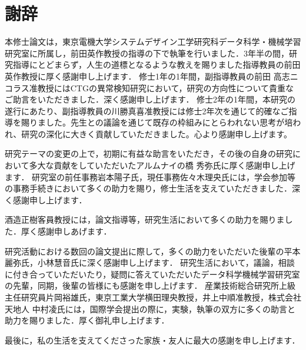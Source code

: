 \chapter*{謝辞}
本修士論文は，東京電機大学システムデザイン工学研究科データ科学・機械学習研究室に所属し，前田英作教授の指導の下で執筆を行いました．3年半の間，研究指導にとどまらず，人生の道標となるような教えを賜りました指導教員の前田英作教授に厚く感謝申し上げます．
修士1年の1年間，副指導教員の前田 高志ニコラス准教授にはCTGの異常検知研究において，研究の方向性について貴重なご助言をいただきました．深く感謝申し上げます．
修士2年の1年間，本研究の遂行にあたり、副指導教員の川勝真喜准教授には修士2年次を通じて的確なご指導を賜りました。先生との議論を通じて既存の枠組みにとらわれない思考が培われ、研究の深化に大きく貢献していただきました。心より感謝申し上げます。

研究テーマの変更の上で，初期に有益な助言をいただき，その後の自身の研究において多大な貢献をしていただいたアルムナイの橋 秀弥氏に厚く感謝申し上げます．
研究室の前任事務岩本陽子氏，現任事務佐々木理央氏には，学会参加等の事務手続きにおいて多くの助力を賜り，修士生活を支えていただきました．深く感謝申し上げます．

酒造正樹客員教授には，論文指導等，研究生活において多くの助力を賜りました．厚く感謝申しあげます．

研究活動における数回の論文提出に際して，多くの助力をいただいた後輩の平本麗弥氏，小林慧音氏に深く感謝申し上げます．
研究生活において，議論，相談に付き合っていただいたり，疑問に答えていただいたデータ科学機械学習研究室の先輩，同期，後輩の皆様にも感謝を申し上げます．
産業技術総合研究所上級主任研究員片岡裕雄氏，東京工業大学横田理央教授，井上中順准教授，株式会社天地人 中村凌氏には，国際学会提出の際に，実験，執筆の双方に多くの助言と助力を賜りました．厚く御礼申し上げます．

最後に，私の生活を支えてくださった家族・友人に最大の感謝を申し上げます．

\newpage
